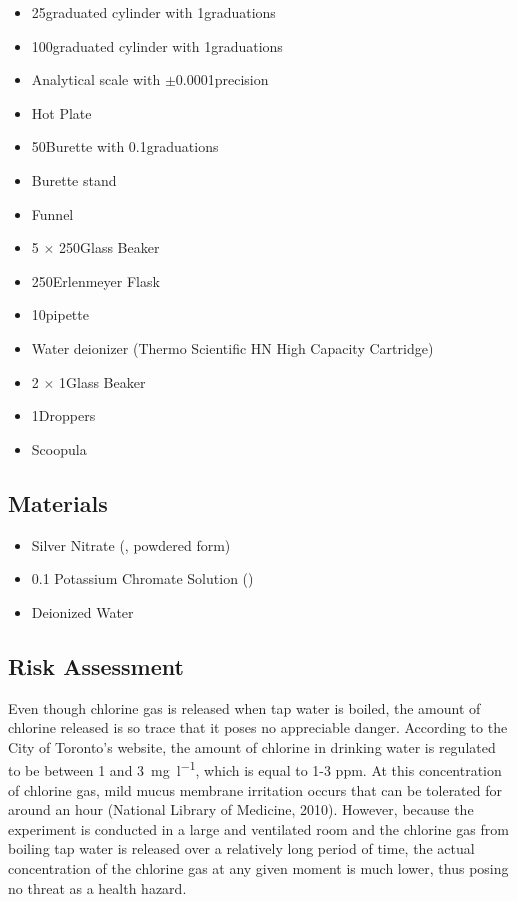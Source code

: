 \documentclass[11pt]{article}
\begin{document}
\begin{itemize}
	\item 25\ml graduated cylinder with 1\ml graduations
	\item 100\ml graduated cylinder with 1\ml graduations
	\item Analytical scale with $\pm$0.0001\gram precision

	\item Hot Plate
	\item 50\ml Burette with 0.1\ml graduations
	\item Burette stand
	\item Funnel

	\item 5 $\times$ 250\ml Glass Beaker
	\item 250\ml Erlenmeyer Flask
	\item 10\ml pipette

	\item Water deionizer (Thermo Scientific HN High Capacity Cartridge)

	\item 2 $\times$ 1\litre Glass Beaker
	\item 1\ml Droppers
	\item Scoopula
\end{itemize}

\subsection{Materials}

\begin{itemize}
	\item Silver Nitrate (, powdered form)
	\item 0.1 \mpl Potassium Chromate Solution ()
	\item Deionized Water
\end{itemize}

\subsection{Risk Assessment}

Even though chlorine gas is released when tap water is boiled, the amount of chlorine released is so trace that it poses no appreciable danger. According to the City of Toronto's website, the amount of chlorine in drinking water is regulated to be between 1 and \SI{3}{\mg\per\litre}, which is equal to 1-3 ppm. At this concentration of chlorine gas, mild mucus membrane irritation occurs that can be tolerated for around an hour (National Library of Medicine, 2010). However, because the experiment is conducted in a large and ventilated room and the chlorine gas from boiling tap water is released over a relatively long period of time, the actual concentration of the chlorine gas at any given moment is much lower, thus posing no threat as a health hazard.
\end{document}
